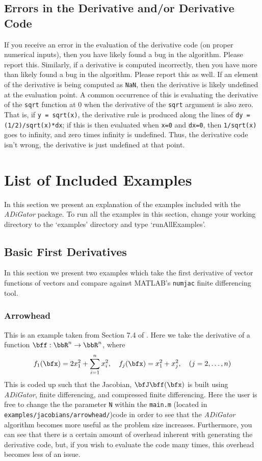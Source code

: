 \documentclass[10pt,pdftex]{article}
\begin{document}
\subsection{Errors in the Derivative and/or Derivative Code}
If you receive an error in the evaluation of the derivative code (on proper numerical inputs), then you have likely found a bug in the algorithm. Please report this. Similarly, if a derivative is computed incorrectly, then you have more than likely found a bug in the algorithm. Please report this as well.
If an element of the derivative is being computed as \texttt{NaN}, then the derivative is likely undefined at the evaluation point.
A common occurrence of this is evaluating the derivative of the \texttt{sqrt} function at 0 when the derivative of the \texttt{sqrt} argument is also zero.
That is, if \texttt{y = sqrt(x)}, the derivative rule is produced along the lines of \texttt{dy = (1/2)/sqrt(x)*dx}; if this is then evaluated when \texttt{x=0} and \texttt{dx=0}, then \texttt{1/sqrt(x)} goes to infinity, and zero times infinity is undefined.
Thus, the derivative code isn't wrong, the derivative is just undefined at that point. 

\section{List of Included Examples}
In this section we present an explanation of the examples included with the \emph{ADiGator} package.
To run all the examples in this section, change your working directory to the `examples' directory and type `runAllExamples'.
\subsection{Basic First Derivatives}
In this section we present two examples which take the first derivative of vector functions of vectors and compare against MATLAB's \texttt{numjac} finite differencing tool.
\subsubsection{Arrowhead}
This is an example taken from Section 7.4 of \cite{Griewank1}. Here we take the derivative of a function $\bff: \bbR^n \rightarrow \bbR^n$, where
\begin{equation}
f_1(\bfx) = 2x^2_1+ \sum^n_{i=1}x_i^2, \quad f_j(\bfx) = x_1^2 + x_j^2, \quad (j = 2,\dots,n)
\end{equation}
This is coded up such that the Jacobian, $\bfJ\bff(\bfx)$ is built using \emph{ADiGator}, finite differencing, and compressed finite differencing. Here the user is free to change the the parameter \texttt{N} within the \texttt{main.m} (located in \texttt{examples/jacobians/arrowhead/})code in order to see that the \emph{ADiGator} algorithm becomes more useful as the problem size increases. Furthermore, you can see that there is a certain amount of overhead inherent with generating the derivative code, but, if you wish to evaluate the code many times, this overhead becomes less of an issue.
\end{document}
